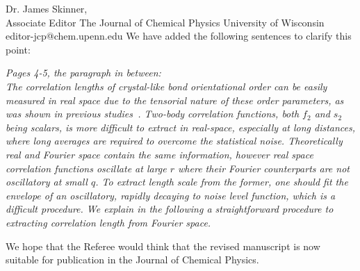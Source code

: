 \documentclass[a4paper, rebuttal, parskip=true, firsthead=false, fromemail=false, foldmarks=false]{scrlttr2}
\begin{document}
\begin{letter}{Dr. James Skinner,\\Associate Editor
The Journal of Chemical Physics
University of Wisconsin\\
editor-jcp@chem.upenn.edu }
We have added the following sentences to clarify this point:

{\it Pages 4-5, the paragraph in between:\\
The correlation lengths of crystal-like bond orientational order can be easily measured in real space due to the tensorial nature
of these order parameters, as was shown in previous studies~\cite{tanaka,kawasaki,mathieu_icosahedra,russo_gcm,russo_hs}. Two-body
correlation functions, both $f_2$ and $s_2$ being scalars, is more difficult to extract in real-space, especially at long distances,
where long averages are required to overcome the statistical noise. Theoretically real and Fourier space contain the same information, however real space correlation functions oscillate at large $r$ where their Fourier counterparts are not oscillatory at small $q$. To extract length scale from the former, one should fit the envelope of an oscillatory, rapidly decaying to noise level function, which is a difficult procedure. We explain in the following a straightforward procedure to extracting correlation length from Fourier space.
}



We hope that the Referee would think that the revised manuscript is now suitable for publication in the Journal of Chemical Physics.



\end{letter} 
\end{document}
